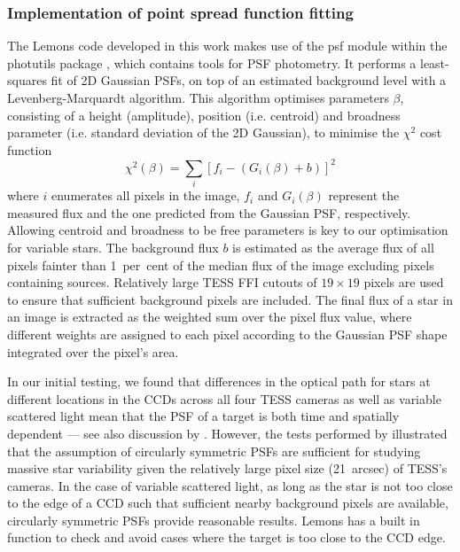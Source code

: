 \documentclass[fleqn,usenatbib]{mnras}
\begin{document}
\subsubsection{Implementation of point spread function fitting}

The {\sc Lemons} code developed in this work makes use of the {\sc psf} module within the {\sc photutils} package \citep{photutils}, which contains tools for PSF photometry. It performs a least-squares fit of 2D Gaussian PSFs, on top of an estimated background level with a Levenberg-Marquardt algorithm. This algorithm optimises parameters $\beta$, consisting of a height (amplitude), position (i.e. centroid) and broadness parameter (i.e. standard deviation of the 2D Gaussian), to minimise the $\chi^2$ cost function 
    \begin{equation}
        \chi^2(\beta) = \sum_{i}\left[ f_i - (G_i(\beta) +b)\right]^2
    \end{equation}
where $i$ enumerates all pixels in the image, $f_i$ and $G_i(\beta)$ represent the measured flux and the one predicted from the Gaussian PSF, respectively. Allowing centroid and broadness to be free parameters is key to our optimisation for variable stars. The background flux $b$ is estimated as the average flux of all pixels fainter than 1~per~cent of the median flux of the image excluding pixels containing sources. Relatively large TESS FFI cutouts of $19 \times 19$ pixels are used to ensure that sufficient background pixels are included. The final flux of a star in an image is extracted as the weighted sum over the pixel flux value, where different weights are assigned to each pixel according to the Gaussian PSF shape integrated over the pixel's area.

In our initial testing, we found that differences in the optical path for stars at different locations in the CCDs across all four TESS cameras as well as variable scattered light mean that the PSF of a target is both time and spatially dependent \citep{VanDaele_MScThesis} --- see also discussion by \citet{Han+2023_tglc}. 
However, the tests performed by \citet{VanDaele_MScThesis} illustrated that the assumption of circularly symmetric PSFs are sufficient for studying massive star variability given the relatively large pixel size (21~arcsec) of TESS's cameras. In the case of variable scattered light, as long as the star is not too close to the edge of a CCD such that sufficient nearby background pixels are available, circularly symmetric PSFs provide reasonable results. {\sc Lemons} has a built in function to check and avoid cases where the target is too close to the CCD edge.
\end{document}
